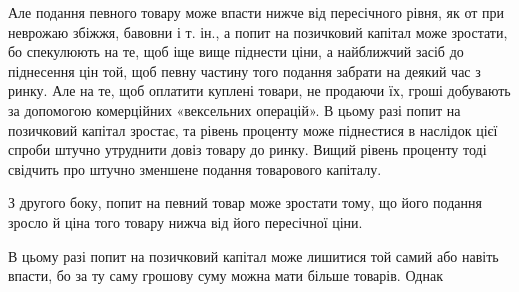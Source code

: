 Але подання певного товару може впасти нижче від пересічного рівня, як
от при неврожаю збіжжя, бавовни і т. ін., а попит на позичковий капітал може
зростати, бо спекулюють на те, щоб іще вище піднести ціни, а найближчий
засіб до піднесення цін той, щоб певну частину того подання забрати на деякий
час з ринку. Але на те, щоб оплатити куплені товари, не продаючи їх,
гроші добувають за допомогою комерційних «вексельних операцій». В цьому
разі попит на позичковий капітал зростає, та рівень проценту може піднестися
в наслідок цієї спроби штучно утруднити довіз товару до ринку. Вищий рівень
проценту тоді свідчить про штучно зменшене подання товарового капіталу.

З другого боку, попит на певний товар може зростати тому, що його подання
зросло й ціна того товару нижча від його пересічної ціни.

В цьому разі попит на позичковий капітал може лишитися той самий або
навіть впасти, бо за ту саму грошову суму можна мати більше товарів. Однак
\parbreak{}  %
